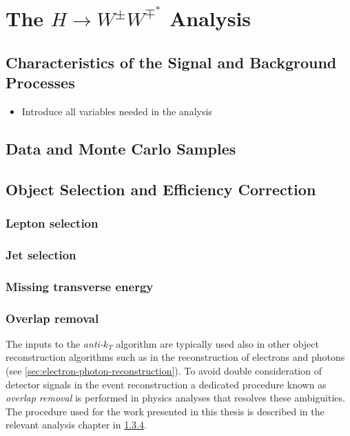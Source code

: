 \chapter{The $H\rightarrow W^{\pm}W^{\mp^*}$ Analysis}
\label{chap:hww}


\section{Characteristics of the Signal and Background Processes}
\begin{itemize}
    \item Introduce all variables needed in the analysis
\end{itemize}

\section{Data and Monte Carlo Samples}


\section{Object Selection and Efficiency Correction}
\subsection{Lepton selection}
\subsection{Jet selection}


\subsection{Missing transverse energy}
\subsection{Overlap removal}
\label{subsec:overlap-removal}

The inputs to the \emph{anti-$k_T$} algorithm are typically used also in other object reconstruction algorithms such as in the reconstruction of electrons and photons (see \cref{sec:electron-photon-reconstruction}).
To avoid double consideration of detector signals in the event reconstruction a dedicated procedure known as \emph{overlap removal} is performed in physics analyses that resolves these ambiguities. The procedure used for the work presented in this thesis is described in the relevant analysis chapter in \cref{subsec:overlap-removal}.


